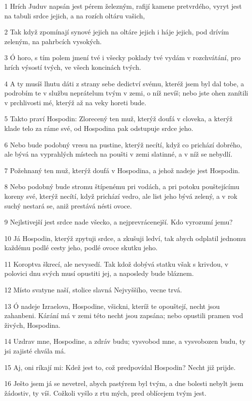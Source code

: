 \par 1 Hrích Juduv napsán jest pérem železným, rafijí kamene pretvrdého, vyryt jest na tabuli srdce jejich, a na rozích oltáru vašich,
\par 2 Tak když zpomínají synové jejich na oltáre jejich i háje jejich, pod drívím zeleným, na pahrbcích vysokých.
\par 3 Ó horo, s tím polem jmení tvé i všecky poklady tvé vydám v rozchvátání, pro hrích výsostí tvých, ve všech koncinách tvých.
\par 4 A ty musíš lhutu dáti z strany sebe dedictví svému, kteréž jsem byl dal tobe, a podrobím te v službu neprátelum tvým v zemi, o níž nevíš; nebo jste ohen zanítili v prchlivosti mé, kterýž až na veky horeti bude.
\par 5 Takto praví Hospodin: Zlorecený ten muž, kterýž doufá v cloveka, a kterýž klade telo za ráme své, od Hospodina pak odstupuje srdce jeho.
\par 6 Nebo bude podobný vresu na pustine, kterýž necítí, když co prichází dobrého, ale bývá na vyprahlých místech na poušti v zemi slatinné, a v níž se nebydlí.
\par 7 Požehnaný ten muž, kterýž doufá v Hospodina, a jehož nadeje jest Hospodin.
\par 8 Nebo podobný bude stromu štípenému pri vodách, a pri potoku pouštejícímu koreny své, kterýž necítí, když prichází vedro, ale list jeho bývá zelený, a v rok suchý nestará se, aniž prestává nésti ovoce.
\par 9 Nejlstivejší jest srdce nade všecko, a nejprevrácenejší. Kdo vyrozumí jemu?
\par 10 Já Hospodin, kterýž zpytuji srdce, a zkušuji ledví, tak abych odplatil jednomu každému podlé cesty jeho, podlé ovoce skutku jeho.
\par 11 Koroptva škrecí, ale nevysedí. Tak kdož dobývá statku však s krivdou, v polovici dnu svých musí opustiti jej, a naposledy bude bláznem.
\par 12 Místo svatyne naší, stolice slavná Nejvyššího, vecne trvá.
\par 13 Ó nadeje Izraelova, Hospodine, všickni, kteríž te opouštejí, necht jsou zahanbeni. Kárání má v zemi této necht jsou zapsána; nebo opustili pramen vod živých, Hospodina.
\par 14 Uzdrav mne, Hospodine, a zdráv budu; vysvobod mne, a vysvobozen budu, ty jsi zajisté chvála má.
\par 15 Aj, oni ríkají mi: Kdež jest to, což predpovídal Hospodin? Necht již prijde.
\par 16 Ješto jsem já se nevetrel, abych pastýrem byl tvým, a dne bolesti nebylt jsem žádostiv, ty víš. Cožkoli vyšlo z rtu mých, pred oblícejem tvým jest.
